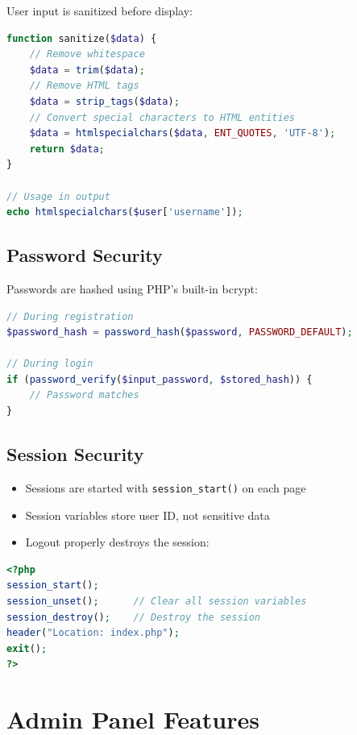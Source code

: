 \documentclass[12pt,a4paper]{article}
\begin{document}
User input is sanitized before display:

\begin{lstlisting}[language=PHP, caption=Input Sanitization]
function sanitize($data) {
    // Remove whitespace
    $data = trim($data);
    // Remove HTML tags
    $data = strip_tags($data);
    // Convert special characters to HTML entities
    $data = htmlspecialchars($data, ENT_QUOTES, 'UTF-8');
    return $data;
}

// Usage in output
echo htmlspecialchars($user['username']);
\end{lstlisting}

\subsection{Password Security}

Passwords are hashed using PHP's built-in bcrypt:

\begin{lstlisting}[language=PHP, caption=Password Hashing]
// During registration
$password_hash = password_hash($password, PASSWORD_DEFAULT);

// During login
if (password_verify($input_password, $stored_hash)) {
    // Password matches
}
\end{lstlisting}

\subsection{Session Security}

\begin{itemize}
    \item Sessions are started with \texttt{session\_start()} on each page
    \item Session variables store user ID, not sensitive data
    \item Logout properly destroys the session:
\end{itemize}

\begin{lstlisting}[language=PHP, caption=Secure Logout]
<?php
session_start();
session_unset();      // Clear all session variables
session_destroy();    // Destroy the session
header("Location: index.php");
exit();
?>
\end{lstlisting}

\section{Admin Panel Features}
\end{document}
